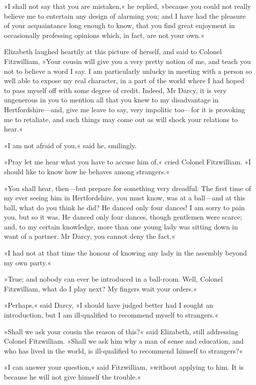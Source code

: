 »I shall not say that you are mistaken,« he replied, »because you could not really believe me to entertain any design of alarming you; and I have had the pleasure of your acquaintance long enough to know, that you find great enjoyment in occasionally professing opinions which, in fact, are not your own.«

Elizabeth laughed heartily at this picture of herself, and said to Colonel Fitzwilliam, »Your cousin will give you a very pretty notion of me, and teach you not to believe a word I say. I am particularly unlucky in meeting with a person so well able to expose my real character, in a part of the world where I had hoped to pass myself off with some degree of credit. Indeed, Mr Darcy, it is very ungenerous in you to mention all that you knew to my disadvantage in Hertfordshire—and, give me leave to say, very impolitic too—for it is provoking me to retaliate, and such things may come out as will shock your relations to hear.«

»I am not afraid of you,« said he, smilingly.

»Pray let me hear what you have to accuse him of,« cried Colonel Fitzwilliam. »I should like to know how he behaves among strangers.«

»You shall hear, then—but prepare for something very dreadful. The first time of my ever seeing him in Hertfordshire, you must know, was at a ball—and at this ball, what do you think he did? He danced only four dances! I am sorry to pain you, but so it was. He danced only four dances, though gentlemen were scarce; and, to my certain knowledge, more than one young lady was sitting down in want of a partner. Mr Darcy, you cannot deny the fact.«

»I had not at that time the honour of knowing any lady in the assembly beyond my own party.«

»True; and nobody can ever be introduced in a ball-room. Well, Colonel Fitzwilliam, what do I play next? My fingers wait your orders.«

»Perhaps,« said Darcy, »I should have judged better had I sought an introduction, but I am ill-qualified to recommend myself to strangers.«

»Shall we ask your cousin the reason of this?« said Elizabeth, still addressing Colonel Fitzwilliam. »Shall we ask him why a man of sense and education, and who has lived in the world, is ill-qualified to recommend himself to strangers?«

»I can answer your question,« said Fitzwilliam, »without applying to him. It is because he will not give himself the trouble.«

